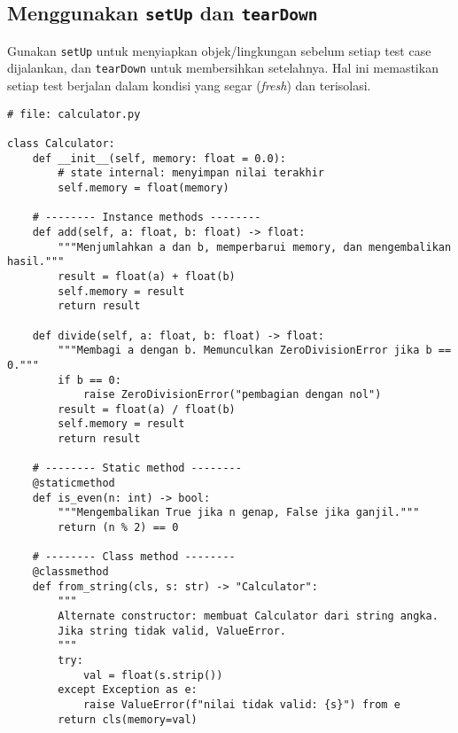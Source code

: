 \subsection{Menggunakan \texttt{setUp} dan \texttt{tearDown}}

Gunakan \texttt{setUp} untuk menyiapkan objek/lingkungan sebelum setiap test case dijalankan, dan \texttt{tearDown} untuk membersihkan setelahnya.  
Hal ini memastikan setiap test berjalan dalam kondisi yang segar (\emph{fresh}) dan terisolasi.

\begin{lstlisting}[style=PythonStyle, caption={Kode kelas contoh untuk diuji}, label={lst:calculator-impl}]
# file: calculator.py

class Calculator:
    def __init__(self, memory: float = 0.0):
        # state internal: menyimpan nilai terakhir
        self.memory = float(memory)

    # -------- Instance methods --------
    def add(self, a: float, b: float) -> float:
        """Menjumlahkan a dan b, memperbarui memory, dan mengembalikan hasil."""
        result = float(a) + float(b)
        self.memory = result
        return result

    def divide(self, a: float, b: float) -> float:
        """Membagi a dengan b. Memunculkan ZeroDivisionError jika b == 0."""
        if b == 0:
            raise ZeroDivisionError("pembagian dengan nol")
        result = float(a) / float(b)
        self.memory = result
        return result

    # -------- Static method --------
    @staticmethod
    def is_even(n: int) -> bool:
        """Mengembalikan True jika n genap, False jika ganjil."""
        return (n % 2) == 0

    # -------- Class method --------
    @classmethod
    def from_string(cls, s: str) -> "Calculator":
        """
        Alternate constructor: membuat Calculator dari string angka.
        Jika string tidak valid, ValueError.
        """
        try:
            val = float(s.strip())
        except Exception as e:
            raise ValueError(f"nilai tidak valid: {s}") from e
        return cls(memory=val)
\end{lstlisting}

